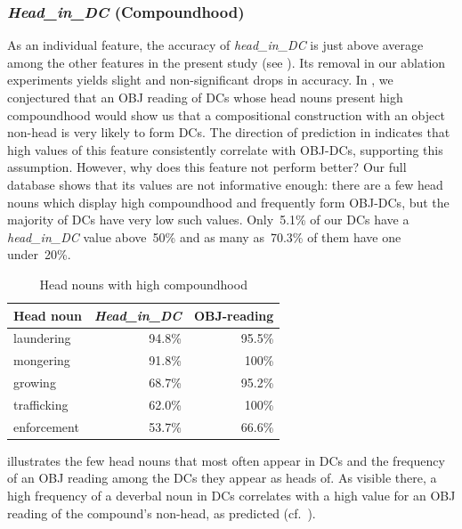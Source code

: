 \documentclass[output=paper]{langsci/langscibook}
\begin{document}
\subsubsection{\textit{Head\_in\_DC} (Compoundhood)} 
As an individual feature, the accuracy of \textit{head\_in\_DC} is just above average among the other features in the present study (see ). Its removal in our ablation experiments  yields  slight and non-significant drops in accuracy. In , we conjectured that an OBJ reading of DCs whose head nouns present high compoundhood would show us that a compositional construction with an object non-head is very likely to form DCs. The  direction of prediction in  indicates that high values of this feature consistently correlate with OBJ-DCs, supporting this assumption. However, why does this feature not perform better? Our full database shows that its values are not informative enough: there are a few head nouns which display high compoundhood and frequently form OBJ-DCs, but the majority of DCs  have very low such values. Only~5.1\% of our DCs have a \textit{head\_in\_DC} value above~50\% and as many as~70.3\% of them have one under~20\%. 
\begin{table}
\caption{\label{tab:compoundhood:ex} Head nouns with high compoundhood}
\begin{tabular}{|l|r|r|}
\hline
\textbf{Head noun}&\textbf{\textit{Head\_in\_DC}}&\textbf{OBJ-reading}\\
\hline
laundering&94.8\%&95.5\%\\ \hline
mongering&91.8\%&100\%\\\hline
growing&68.7\% &95.2\%\\\hline
trafficking&62.0\%&100\%\\   \hline
enforcement&53.7\%&66.6\%\\ \hline
\end{tabular}
\end{table}

 illustrates the few head nouns that most often appear in DCs and the frequency of an OBJ reading among the DCs they appear as heads of. As visible there, a high frequency of a deverbal noun in DCs correlates with a high value for an OBJ reading of the compound's non-head, as predicted (cf.~). 
\end{document}
